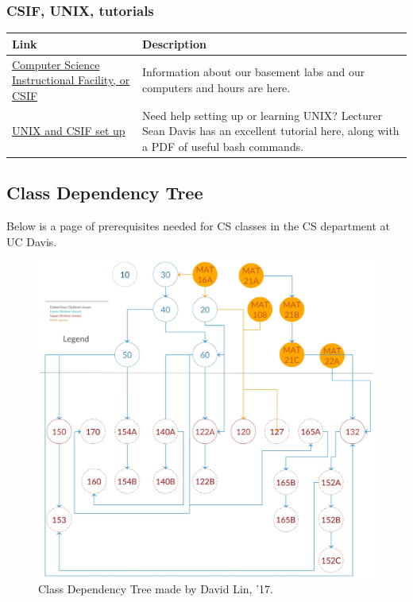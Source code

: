 \documentclass{article}
\begin{document}
\subsubsection{CSIF, UNIX, tutorials}
\begin{center}
{\tabulinesep=1.4mm
\begin{tabu} {|p{6cm} |p{8cm}|}
\hline
\textbf{Link} & \textbf{Description} \\ 
\hline
\href{http://csifdocs.cs.ucdavis.edu/}{Computer Science Instructional Facility, or CSIF} &
Information about our basement labs and our computers and hours are here. \\
\hline
\href{http://csiflabs.cs.ucdavis.edu/~ssdavis/30/UnixWorkshop.pdf}{UNIX and CSIF set up} & Need help setting up or learning UNIX? Lecturer Sean Davis has an excellent tutorial here, along with a PDF of useful bash commands. \\
\hline
\end{tabu}}
\end{center}

\subsection{Class Dependency Tree}
\hspace{0.5cm} Below is a page of prerequisites needed for CS classes in the CS department at UC Davis. 
\begin{figure}
  \includegraphics[width=\linewidth]{classdep.jpg}
  \caption{Class Dependency Tree made by David Lin, '17.}
\end{figure}
\newpage
\end{document}
